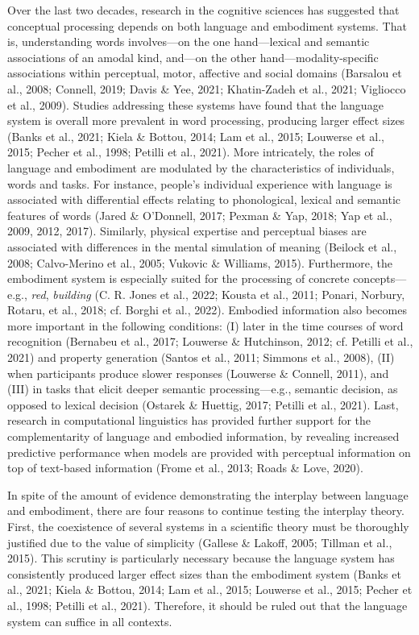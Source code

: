 \documentclass[
  12pt,
  man,floatsintext]{apa7}
\begin{document}
\bigskip
\bigskip
\bigskip

Over the last two decades, research in the cognitive sciences has suggested that conceptual processing depends on both language and embodiment systems. That is, understanding words involves---on the one hand---lexical and semantic associations of an amodal kind, and---on the other hand---modality-specific associations within perceptual, motor, affective and social domains (Barsalou et al., 2008; Connell, 2019; Davis \& Yee, 2021; Khatin-Zadeh et al., 2021; Vigliocco et al., 2009). Studies addressing these systems have found that the language system is overall more prevalent in word processing, producing larger effect sizes (Banks et al., 2021; Kiela \& Bottou, 2014; Lam et al., 2015; Louwerse et al., 2015; Pecher et al., 1998; Petilli et al., 2021). More intricately, the roles of language and embodiment are modulated by the characteristics of individuals, words and tasks. For instance, people's individual experience with language is associated with differential effects relating to phonological, lexical and semantic features of words (Jared \& O'Donnell, 2017; Pexman \& Yap, 2018; Yap et al., 2009, 2012, 2017). Similarly, physical expertise and perceptual biases are associated with differences in the mental simulation of meaning (Beilock et al., 2008; Calvo-Merino et al., 2005; Vukovic \& Williams, 2015). Furthermore, the embodiment system is especially suited for the processing of concrete concepts---e.g., \emph{red}, \emph{building} (C. R. Jones et al., 2022; Kousta et al., 2011; Ponari, Norbury, Rotaru, et al., 2018; cf. Borghi et al., 2022). Embodied information also becomes more important in the following conditions: (I) later in the time courses of word recognition (Bernabeu et al., 2017; Louwerse \& Hutchinson, 2012; cf. Petilli et al., 2021) and property generation (Santos et al., 2011; Simmons et al., 2008), (II) when participants produce slower responses (Louwerse \& Connell, 2011), and (III) in tasks that elicit deeper semantic processing---e.g., semantic decision, as opposed to lexical decision (Ostarek \& Huettig, 2017; Petilli et al., 2021). Last, research in computational linguistics has provided further support for the complementarity of language and embodied information, by revealing increased predictive performance when models are provided with perceptual information on top of text-based information (Frome et al., 2013; Roads \& Love, 2020).

In spite of the amount of evidence demonstrating the interplay between language and embodiment, there are four reasons to continue testing the interplay theory. First, the coexistence of several systems in a scientific theory must be thoroughly justified due to the value of simplicity (Gallese \& Lakoff, 2005; Tillman et al., 2015). This scrutiny is particularly necessary because the language system has consistently produced larger effect sizes than the embodiment system (Banks et al., 2021; Kiela \& Bottou, 2014; Lam et al., 2015; Louwerse et al., 2015; Pecher et al., 1998; Petilli et al., 2021). Therefore, it should be ruled out that the language system can suffice in all contexts.
\end{document}
